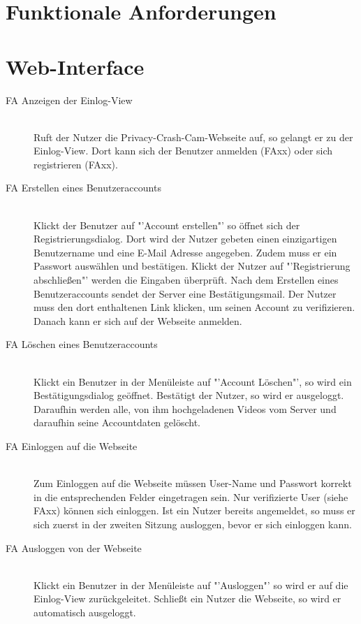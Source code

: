 \section{Funktionale Anforderungen}

\section{Web-Interface}
\begin{description}
\item[FA Anzeigen der Einlog-View] \hfill \\
Ruft der Nutzer die Privacy-Crash-Cam-Webseite auf, so gelangt er zu der Einlog-View. Dort kann sich der Benutzer anmelden (FAxx) oder sich registrieren (FAxx).

\item[FA Erstellen eines Benutzeraccounts] \hfill \\
Klickt der Benutzer auf "'Account erstellen"' so öffnet sich der Registrierungsdialog. Dort wird der Nutzer gebeten einen einzigartigen Benutzername und eine E-Mail Adresse angegeben. Zudem muss er ein Passwort auswählen und bestätigen. Klickt der Nutzer auf "'Registrierung abschließen"' werden die Eingaben überprüft. Nach dem Erstellen eines Benutzeraccounts sendet der Server eine Bestätigungsmail. Der Nutzer muss den dort enthaltenen Link klicken, um seinen Account zu verifizieren. Danach kann er sich auf der Webseite anmelden.

\item[FA Löschen eines Benutzeraccounts] \hfill \\
Klickt ein Benutzer in der Menüleiste auf "'Account Löschen"', so wird ein Bestätigungsdialog geöffnet. Bestätigt der Nutzer, so wird er ausgeloggt. Daraufhin werden alle, von ihm hochgeladenen Videos vom Server und daraufhin seine Accountdaten gelöscht.

\item[FA Einloggen auf die Webseite] \hfill \\
Zum Einloggen auf die Webseite müssen User-Name und Passwort korrekt in die entsprechenden Felder eingetragen sein. Nur verifizierte User (siehe FAxx) können sich einloggen. Ist ein Nutzer bereits angemeldet, so muss er sich zuerst in der zweiten Sitzung ausloggen, bevor er sich einloggen kann.

\item[FA Ausloggen von der Webseite] \hfill \\
Klickt ein Benutzer in der Menüleiste auf "'Ausloggen"' so wird er auf die Einlog-View zurückgeleitet. Schließt ein Nutzer die Webseite, so wird er automatisch ausgeloggt.


\end{description}
